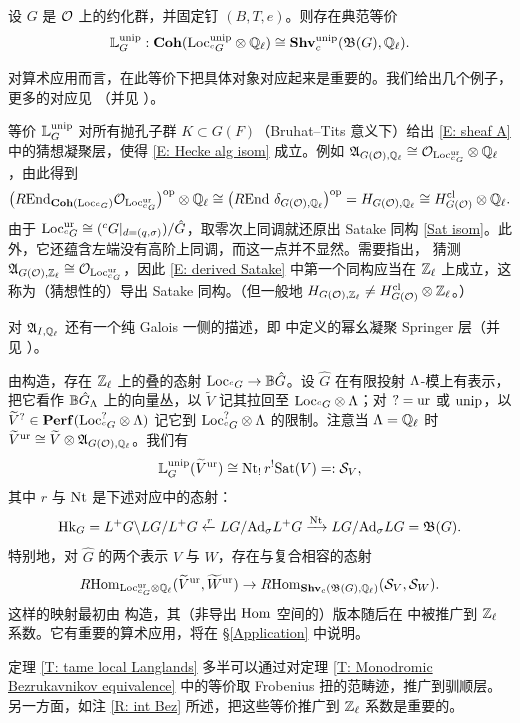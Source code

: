 \begin{thm}\label{T: tame local Langlands}
设 $G$ 是 ${\mathcal O}$ 上的约化群，并固定钉 $(B,T,e)$。则存在典范等价
\[
{\mathbb L}^{{\operatorname{unip}}}_G:  {\mathbf{Coh}}({\operatorname{Loc}}_{{}^cG}^{{\operatorname{unip}}}\otimes{\mathbb Q}_\ell)\cong  {\mathbf{Shv}}_{c}^{{\operatorname{unip}}}({\mathfrak B}(G),{\mathbb Q}_\ell).
\]
\end{thm}

对算术应用而言，在此等价下把具体对象对应起来是重要的。我们给出几个例子，更多的对应见 \cite{Hemo-Zhu-Unipotent}（并见 \cite[Sect. 4.3-4.5]{Zhu-Conjecture}）。

\begin{ex}
等价 ${\mathbb L}_G^{{\operatorname{unip}}}$ 对所有抛孔子群 $K\subset G(F)$（Bruhat--Tits 意义下）给出 \eqref{E: sheaf A} 中的猜想凝聚层，使得 \eqref{E: Hecke alg isom} 成立。例如 ${\mathfrak A}_{G({\mathcal O}),{\mathbb Q}_\ell}\cong {\mathcal O}_{{\operatorname{Loc}}_{{}^cG}^{{\operatorname{ur}}}}\otimes{\mathbb Q}_\ell$，由此得到
\begin{equation}\label{E: derived Satake}
\big(R{\operatorname{End}}_{{\mathbf{Coh}}({\operatorname{Loc}}_{{}^cG})}{\mathcal O}_{{\operatorname{Loc}}_{{}^cG}^{{\operatorname{ur}}}}\big)^{{\operatorname{op}}}\otimes{\mathbb Q}_\ell\cong \big(R{\operatorname{End}}\ \delta_{G({\mathcal O}),{\mathbb Q}_\ell}\big)^{{\operatorname{op}}}= H_{G({\mathcal O}),{\mathbb Q}_\ell}\cong H_{G({\mathcal O})}^{{\operatorname{cl}}}\otimes{\mathbb Q}_\ell.
\end{equation}
由于 ${\operatorname{Loc}}_{{}^cG}^{{\operatorname{ur}}}\cong ({}^cG|_{d=(q,\sigma)})/\hat{G}$，取零次上同调就还原出 Satake 同构 \eqref{Sat isom}。此外，它还蕴含左端没有高阶上同调，而这一点并不显然。需要指出，\cite[Sect. 4.3]{Zhu-Conjecture} 猜测 ${\mathfrak A}_{G({\mathcal O}),{\mathbb Z}_\ell}\cong {\mathcal O}_{{\operatorname{Loc}}_{{}^cG}^{{\operatorname{ur}}}}$，因此 \eqref{E: derived Satake} 中第一个同构应当在 ${\mathbb Z}_\ell$ 上成立，这称为（猜想性的）导出 Satake 同构。（但一般地 $H_{G({\mathcal O}),{\mathbb Z}_\ell}\neq H_{G({\mathcal O})}^{{\operatorname{cl}}}\otimes{\mathbb Z}_\ell$。）

对 ${\mathfrak A}_{I,{\mathbb Q}_\ell}$ 还有一个纯 Galois 一侧的描述，即 \cite{BCHN, Zhu-Conjecture} 中定义的幂幺凝聚 Springer 层（并见 \cite{Hellmann-Iwahori}）。
\end{ex}

\begin{ex}\label{Ex: trace of Satake}
由构造，存在 ${\mathbb Z}_\ell$ 上的叠的态射 ${\operatorname{Loc}}_{{}^cG}\to {\mathbb B}\hat{G}$。设 $\hat{G}$ 在有限投射 ${\Lambda}$-模上有表示，把它看作 ${\mathbb B}\hat{G}_{\Lambda}$ 上的向量丛，以 $\widetilde V$ 记其拉回至 ${\operatorname{Loc}}_{{}^cG}\otimes{\Lambda}$；对 $?={\operatorname{ur}}$ 或 ${\operatorname{unip}}$，以 $\widetilde{V}^{?}\in {\mathbf{Perf}}({\operatorname{Loc}}_{{}^cG}^{?}\otimes{\Lambda})$ 记它到 ${\operatorname{Loc}}_{{}^cG}^?\otimes{\Lambda}$ 的限制。注意当 ${\Lambda}={\mathbb Q}_\ell$ 时 $\widetilde{V}^{{\operatorname{ur}}}\cong \widetilde{V}\otimes {\mathfrak A}_{G({\mathcal O}),{\mathbb Q}_\ell}$。我们有
\[
{\mathbb L}_G^{{\operatorname{unip}}}(\widetilde{V}^{{\operatorname{ur}}})\cong \operatorname{Nt}_!r^!{\operatorname{Sat}}(V)=:{\mathcal S}_V,
\]
其中 $r$ 与 $\operatorname{Nt}$ 是下述对应中的态射：
\[
{\operatorname{Hk}}_G=L^+G\backslash LG/L^+G\xleftarrow{r} LG/{\operatorname{Ad}}_\sigma L^+G\xrightarrow{\operatorname{Nt}} LG/{\operatorname{Ad}}_\sigma LG={{\mathfrak B}}(G).
\]
特别地，对 $\hat{G}$ 的两个表示 $V$ 与 $W$，存在与复合相容的态射
\begin{equation}\label{E: local S-operator}
R{\operatorname{Hom}}_{{\operatorname{Loc}}_{{}^cG}^{{\operatorname{ur}}}\otimes{\mathbb Q}_\ell}(\widetilde{V}^{{\operatorname{ur}}}, \widetilde{W}^{{\operatorname{ur}}})\to R{\operatorname{Hom}}_{{\mathbf{Shv}}_c({{\mathfrak B}}(G),{\mathbb Q}_\ell)}({\mathcal S}_V,{\mathcal S}_W).
\end{equation}
这样的映射最初由 \cite{Xiao-Zhu-Cycle,Zhu-CDM} 构造，其（非导出 ${\operatorname{Hom}}$ 空间的）版本随后在 \cite{Yu-Jacquet-Langlands-Higher-Weights} 中被推广到 ${\mathbb Z}_\ell$ 系数。它有重要的算术应用，将在 \S\ref{Application} 中说明。
\end{ex}

\begin{rmk}
定理 \ref{T: tame local Langlands} 多半可以通过对定理 \ref{T: Monodromic Bezrukavnikov equivalence} 中的等价取 Frobenius 扭的范畴迹，推广到驯顺层。另一方面，如注 \ref{R: int Bez} 所述，把这些等价推广到 ${\mathbb Z}_\ell$ 系数是重要的。
\end{rmk}
